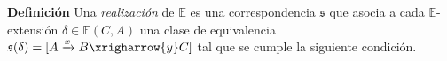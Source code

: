 \documentclass[preview]{standalone}
\begin{document}
\begin{center}
\justifying \textbf{Definición} Una \emph{realización} de $\mathbb{E}$ es una correspondencia $\mathfrak{s}$ que asocia a cada $\mathbb{E}$-extensión $\delta\in\mathbb{E}(C,A)$ una clase de equivalencia $\mathfrak{s}(\delta) = [A\xrightarrow{x}B\xrigharrow{y}C]$ tal que se cumple la siguiente condición.
\end{center}
\end{document}
